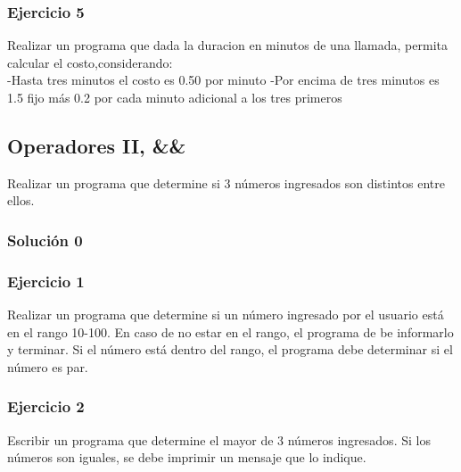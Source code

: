 \subsubsection{Ejercicio 5} 
Realizar un programa que dada la duracion en minutos de una llamada, permita calcular el costo,considerando:\\
-Hasta tres minutos el costo es 0.50 por minuto
-Por encima de tres minutos es 1.5 fijo más 0.2 por cada minuto adicional a los tres primeros
{\small
  \lstset{inputencoding=utf8/latin1}
  
}



\subsection*{Operadores II, \&\&} 
Realizar un programa que determine si 3 números ingresados son distintos entre ellos.
\subsubsection{Solución 0} 

\lstset{inputencoding=utf8/latin1}

{\small
  \lstset{inputencoding=utf8/latin1}
}

\subsubsection{Ejercicio 1} 
Realizar un programa que determine si un número ingresado por el usuario está en el rango 10-100. En caso de no estar en el rango, el programa de be informarlo y terminar. Si el número está dentro del rango, el programa debe determinar si el número es par.
{\small
  \lstset{inputencoding=utf8/latin1}
  
}

\subsubsection{Ejercicio 2} 
Escribir un programa que determine el mayor de 3 números ingresados. Si los números son iguales, se debe imprimir un mensaje que lo indique.
{\small
  \lstset{inputencoding=utf8/latin1}
  
}

